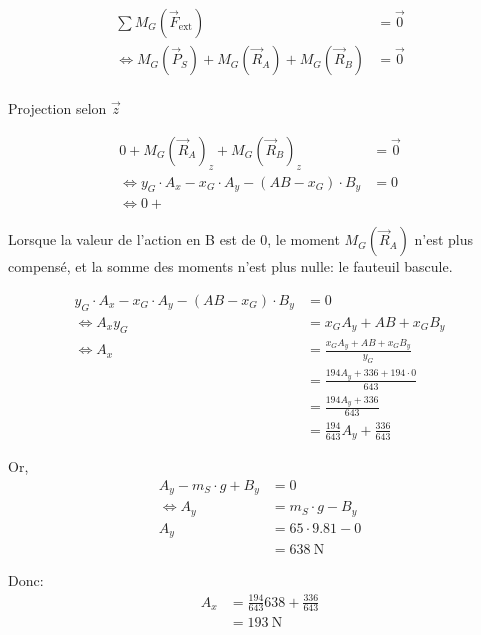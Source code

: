 \documentclass{article}
\begin{document}
\begin{equation*}
  \begin{split}
    \sum M_G(\vec F_\text{ext}) &= \vec 0 \\
    \iff M_G(\vec P_S) + M_G(\vec R_A) + M_G(\vec R_B) &= \vec 0 \\
  \end{split}
\end{equation*}

Projection selon $\vec z$

\begin{equation*}
  \begin{split}
    0 + M_G(\vec R_A)_z + M_G(\vec R_B)_z &= \vec 0 \\
    \iff y_G \cdot A_x - x_G \cdot A_y - (AB - x_G) \cdot B_y &= 0 \\
    \iff 0 + 
  \end{split}
\end{equation*}

Lorsque la valeur de l'action en B est de $0$, le moment $M_G(\vec R_A)$ n'est plus compensé, et la somme des moments n'est plus nulle: le fauteuil bascule.

\begin{equation*}
  \begin{split}
    y_G \cdot A_x - x_G \cdot A_y - (AB - x_G) \cdot B_y &= 0 \\
    \iff A_x y_G &= x_G A_y + AB + x_G B_y \\
    \iff A_x &= \frac{x_G A_y + AB + x_G B_y}{y_G} \\
    &= \frac{194 A_y + 336 +  194 \cdot 0}{643} \\
    &= \frac{194A_y + 336}{643} \\
    &= \frac{194}{643}A_y + \frac{336}{643}
  \end{split}
\end{equation*}

Or,
\begin{equation*}
  \begin{split}
    A_y - m_S \cdot g + B_y &= 0 \\
    \iff A_y &= m_S \cdot g - B_y \\
    A_y &= 65 \cdot 9.81 - 0\\
    &= \SI{638}{\newton}
  \end{split}
\end{equation*}

Donc:
\begin{equation*}
  \begin{split}
    A_x &= \frac{194}{643}638 + \frac{336}{643} \\
    &= \SI{193}{\newton}
  \end{split}
\end{equation*}
\end{document}
